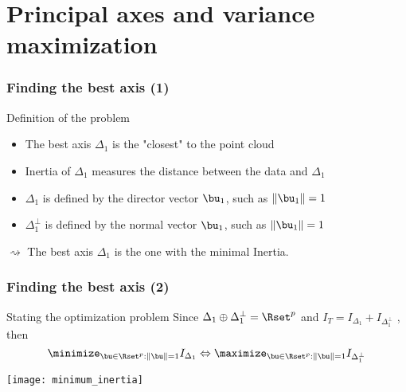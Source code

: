 \section{Principal axes and variance maximization}

\begin{frame}
  \frametitle{Finding the best axis (1)}

  \begin{block}{Definition of the problem}
    \begin{itemize}
      \item The best axis $\Delta_1$ is the "closest" to the point cloud
      \item Inertia of $\Delta_1$ measures the distance between the data and $\Delta_1$
      \item $\Delta_1$ is defined by the director vector $\bu_1$, such as $\| \bu_1 \| = 1$
      \item $\Delta_1^\bot$ is defined by the normal  vector $\bu_1$, such as $\| \bu_1 \| = 1$
    \end{itemize}
    \alert{$\rightsquigarrow$ The best axis $\Delta_1$ is the one with the minimal Inertia.}
  \end{block}
  
\end{frame}

\begin{frame}
  \frametitle{Finding the best axis (2)}

  \begin{block}{Stating the optimization problem}
    Since $\Delta_1 \oplus \Delta_1^\bot = \Rset^p$ and $I_T = I_{\Delta_1} + I_{\Delta_1^\bot}$ , then
    \begin{equation*}
        \minimize_{\bu \in \Rset^p: \|\bu\| = 1} I_{\Delta_1} \Leftrightarrow \maximize_{\bu \in \Rset^p: \|\bu\| = 1} I_{\Delta_1^\bot}
    \end{equation*} 
  \end{block}  
  
  \texttt{[image: minimum\_inertia]}
  
\end{frame}

